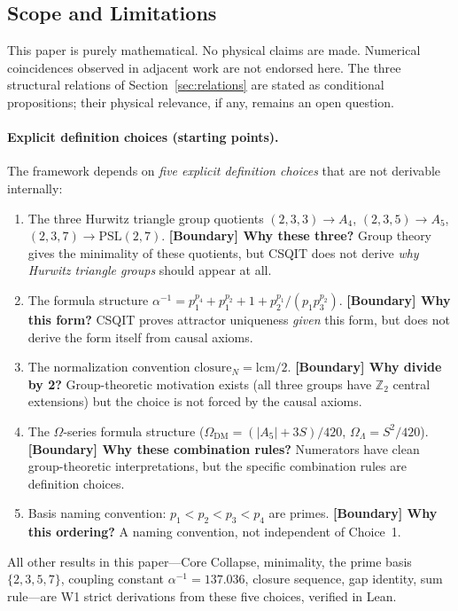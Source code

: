 ﻿\documentclass[11pt]{article}
\newcommand{\bc}[1]{\textcolor{bcolor}{\textbf{[Boundary] #1}}}
\begin{document}
\subsection{Scope and Limitations}
This paper is purely mathematical. No physical claims are
made. Numerical coincidences observed in adjacent work
are not endorsed here. The three structural relations of
Section~\ref{sec:relations} are stated as conditional
propositions; their physical relevance, if any, remains
an open question.

\paragraph{Explicit definition choices (starting points).}
The framework depends on \emph{five explicit definition
choices} that are not derivable internally:
\begin{enumerate}
\item The three Hurwitz triangle group quotients
  $(2,3,3) \to A_4$, $(2,3,5) \to A_5$,
  $(2,3,7) \to \mathrm{PSL}(2,7)$.
  \bc{Why these three?} Group theory gives the minimality
  of these quotients, but CSQIT does not derive \emph{why
  Hurwitz triangle groups} should appear at all.
\item The formula structure
  $\alpha^{-1} = p_1^{p_4} + p_1^{p_2} + 1 + p_2^{p_1}/(p_1 p_3^{p_2})$.
  \bc{Why this form?} CSQIT proves attractor uniqueness
  \emph{given} this form, but does not derive the form
  itself from causal axioms.
\item The normalization convention
  $\mathrm{closure}_N = \mathrm{lcm}/2$.
  \bc{Why divide by 2?} Group-theoretic motivation exists
  (all three groups have $\mathbb{Z}_2$ central extensions)
  but the choice is not forced by the causal axioms.
\item The $\Omega$-series formula structure
  ($\Omega_{\mathrm{DM}} = (|A_5| + 3S)/420$,
  $\Omega_\Lambda = S^2/420$).
  \bc{Why these combination rules?} Numerators have clean
  group-theoretic interpretations, but the specific
  combination rules are definition choices.
\item Basis naming convention: $p_1 < p_2 < p_3 < p_4$
  are primes.
  \bc{Why this ordering?} A naming convention, not
  independent of Choice~1.
\end{enumerate}
All other results in this paper---Core Collapse, minimality,
the prime basis $\{2,3,5,7\}$, coupling constant
$\alpha^{-1} = 137.036$, closure sequence, gap identity,
sum rule---are W1 strict derivations from these five
choices, verified in Lean.
\end{document}
